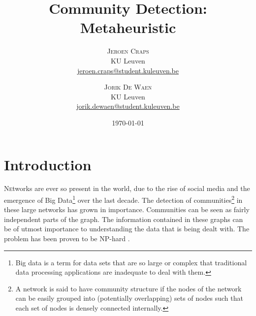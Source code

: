 \documentclass[twoside,twocolumn]{article}
\title{Community Detection: Metaheuristic} %
\author{%
\textsc{Jeroen Craps} \\[1ex] %
\normalsize KU Leuven \\ %
\normalsize \href{mailto:jeroen.craps@student.kuleuven.be}{jeroen.craps@student.kuleuven.be} %
\and %
\textsc{Jorik De Waen} \\[1ex] %
\normalsize KU Leuven \\ %
\normalsize \href{mailto:jorik.dewaen@student.kuleuven.be}{jorik.dewaen@student.kuleuven.be} %
}
\date{\today} %
\begin{document}
\maketitle


\section{Introduction}

\lettrine[nindent=0em,lines=3]{N} etworks are ever so present in the world, due to the rise of social media and the emergence of Big Data\footnote{Big data is a term for data sets that are so large or complex that traditional data processing applications are inadequate to deal with them.} over the last decade.
The detection of communities\footnote{A network is said to have community structure if the nodes of the network can be easily grouped into (potentially overlapping) sets of nodes such that each set of nodes is densely connected internally.} in these large networks has grown in importance.
Communities can be seen as fairly independent parts of the graph.
The information contained in these graphs can be of utmost importance to understanding the data that is being dealt with.
The problem has been proven to be NP-hard \cite{Fortunato2010}.

\end{document}
